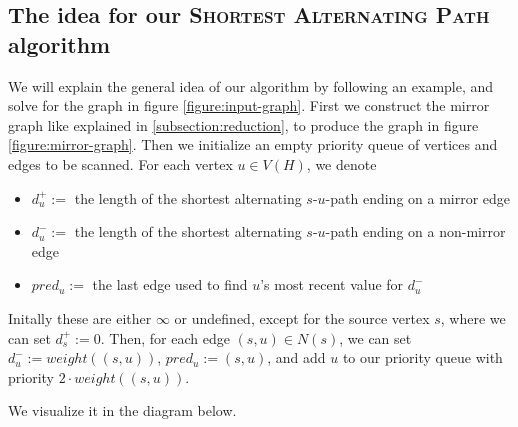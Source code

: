 \subsection{The idea for our \textsc{Shortest Alternating Path} algorithm}
We will explain the general idea of our algorithm by following an example, and solve for the graph in figure \ref{figure:input-graph}. First we construct the mirror graph like explained in \ref{subsection:reduction}, to produce the graph in figure \ref{figure:mirror-graph}. Then we initialize an empty priority queue of vertices and edges to be scanned. For each vertex $u \in V(H)$, we denote
\begin{itemize}
    \item $d^+_u :=$ the length of the shortest alternating $s$-$u$-path ending on a mirror edge
    \item $d^-_u :=$ the length of the shortest alternating $s$-$u$-path ending on a non-mirror edge
    \item $pred_u :=$ the last edge used to find $u$'s most recent value for $d^-_u$
\end{itemize}

Initally these are either $\infty$ or undefined, except for the source vertex $s$, where we can set $d^+_s := 0$. Then, for each edge $(s,u) \in N(s)$, we can set $d^-_u := weight((s,u))$, $pred_u := (s,u)$, and add $u$ to our priority queue with priority $2 \cdot weight((s,u))$.

We visualize it in the diagram below.


